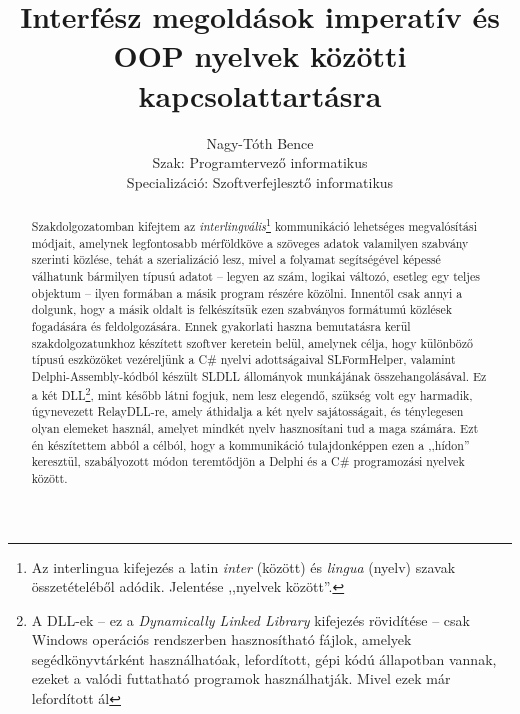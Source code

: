 \documentclass[tocnopagenum]{thesis-ekf}
\theoremstyle{definition}
\theoremstyle{remark}
\begin{document}
	\title{Interfész megoldások imperatív és OOP nyelvek közötti kapcsolattartásra}
	\author{Nagy-Tóth Bence\\Szak: Programtervező informatikus\\Specializáció: Szoftverfejlesztő informatikus}
	\date{\the\year{}}
	\VerbatimFootnotes
	\maketitle
	\tableofcontents
	\begin{abstract}
		Szakdolgozatomban kifejtem az \textit{interlingvális}\footnote{Az interlingua kifejezés a latin \textit{inter} (között) és \textit{lingua} (nyelv) szavak összetételéből adódik. Jelentése ,,nyelvek között''.} kommunikáció lehetséges megvalósítási módjait, amelynek legfontosabb mérföldköve a szöveges adatok valamilyen szabvány szerinti közlése, tehát a szerializáció lesz, mivel a folyamat segítségével képessé válhatunk bármilyen típusú adatot -- legyen az szám, logikai változó, esetleg egy teljes objektum -- ilyen formában a másik program részére közölni. Innentől csak annyi a dolgunk, hogy a másik oldalt is felkészítsük ezen szabványos formátumú közlések fogadására és feldolgozására. Ennek gyakorlati haszna bemutatásra kerül szakdolgozatunkhoz készített szoftver keretein belül, amelynek célja, hogy különböző típusú eszközöket vezéreljünk a C\# nyelvi adottságaival SLFormHelper, valamint Delphi-Assembly-kódból készült SLDLL állományok munkájának összehangolásával. Ez a két DLL\footnote{A DLL-ek -- ez a \textit{Dynamically Linked Library} kifejezés rövidítése -- csak Windows operációs rendszerben hasznosítható fájlok, amelyek segédkönyvtárként használhatóak, lefordított, gépi kódú állapotban vannak, ezeket a valódi futtatható programok használhatják. Mivel ezek már lefordított ál}, mint később látni fogjuk, nem lesz elegendő, szükség volt egy harmadik, úgynevezett RelayDLL-re, amely áthidalja a két nyelv sajátosságait, és ténylegesen olyan elemeket használ, amelyet mindkét nyelv hasznosítani tud a maga számára. Ezt én készítettem abból a célból, hogy a kommunikáció tulajdonképpen ezen a ,,hídon'' keresztül, szabályozott módon teremtődjön a Delphi és a C\# programozási nyelvek között.
	\end{abstract}
\end{document}
